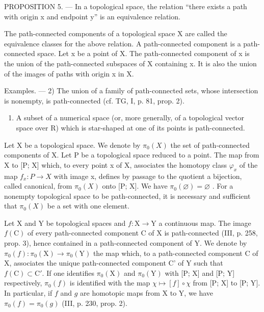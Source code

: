 PROPOSITION 5. --- In a topological space, the relation “there exists a path with origin x and endpoint y” is an equivalence relation.

The path-connected components of a topological space X are called the equivalence classes for the above relation. A path-connected component is a path-connected space. Let x be a point of X. The path-connected component of x is the union of the path-connected subspaces of X containing x. It is also the union of the images of paths with origin x in X.

Examples. --- 2) The union of a family of path-connected sets, whose intersection is nonempty, is path-connected (cf. TG, I, p. 81, prop. 2).

\begin{enumerate}
\def\labelenumi{\arabic{enumi})}
\setcounter{enumi}{2}
\tightlist
\item
  A subset of a numerical space (or, more generally, of a topological vector space over R) which is star-shaped at one of its points is path-connected.
\end{enumerate}

Let X be a topological space. We denote by \(\pi_{0}(X)\) the set of path-connected components of X. Let P be a topological space reduced to a point. The map from X to {[}P; X{]} which, to every point x of X, associates the homotopy class \(\varphi_{x}\) of the map \(f_{x}: P \to X\) with image x, defines by passage to the quotient a bijection, called canonical, from \(\pi_{0}(X)\) onto {[}P; X{]}. We have \(\pi_{0}(\varnothing) = \varnothing\) . For a nonempty topological space to be path-connected, it is necessary and sufficient that \(\pi_{0}(X)\) be a set with one element.

Let X and Y be topological spaces and \(f\colon\mathrm{X}\to\mathrm{Y}\) a continuous map. The image \(f(\mathrm{C})\) of every path-connected component C of X is path-connected (III, p. 258, prop. 3), hence contained in a path-connected component of Y. We denote by \(\pi_{0}(f)\colon\pi_{0}(\mathrm{X})\to\pi_{0}(\mathrm{Y})\) the map which, to a path-connected component C of X, associates the unique path-connected component C' of Y such that \(f(\mathrm{C})\subset\mathrm{C}'\). If one identifies \(\pi_0(\mathrm{X})\) and \(\pi_0(\mathrm{Y})\) with {[}P; X{]} and {[}P; Y{]} respectively, \(\pi_0(f)\) is identified with the map \(\chi \mapsto [f] \circ \chi\) from {[}P; X{]} to {[}P; Y{]}. In particular, if \(f\) and \(g\) are homotopic maps from X to Y, we have \(\pi_0(f) = \pi_0(g)\) (III, p. 230, prop. 2).

